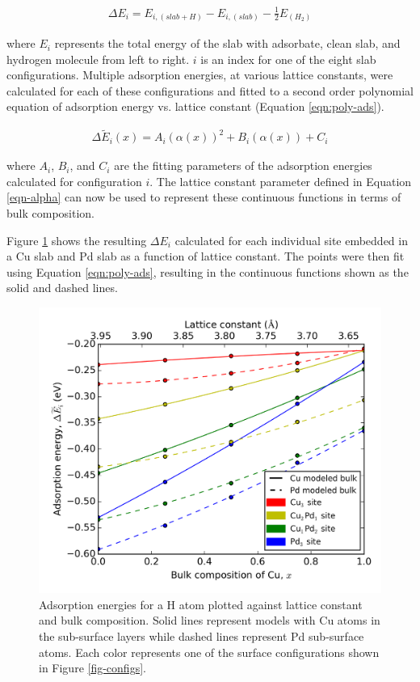 \documentclass[12pt]{cmuthesis}
\begin{document}
\begin{eqnarray}
\Delta E_{i} = E_{i,(slab+H)} - E_{i,(slab)} - \frac{1}{2}E_{(H_{2})} \label{eqn-ads}
\end{eqnarray}

\noindent
where \(E_{i}\) represents the total energy of the slab with adsorbate, clean slab, and hydrogen molecule from left to right. \(i\) is an index for one of the eight slab configurations. Multiple adsorption energies, at various lattice constants, were calculated for each of these configurations and fitted to a second order polynomial equation of adsorption energy vs. lattice constant (Equation \eqref{eqn:poly-ads}).

\begin{eqnarray}
\Delta \widetilde{E}_{i}(x) = A_{i}(\alpha (x))^{2} + B_{i}(\alpha (x)) + C_{i}
\label{eqn:poly-ads}
\end{eqnarray}

\noindent
where \(A_{i}\), \(B_{i}\), and \(C_{i}\) are the fitting parameters of the adsorption energies calculated for configuration \(i\). The lattice constant parameter defined in Equation \eqref{eqn-alpha} can now be used to represent these continuous functions in terms of bulk composition.

Figure \ref{fig:ads-site} shows the resulting \(\Delta E_{i}\) calculated for each individual site embedded in a Cu slab and Pd slab as a function of lattice constant. The points were then fit using Equation \eqref{eqn:poly-ads}, resulting in the continuous functions shown as the solid and dashed lines.

\begin{figure}[h]
\centering
\includegraphics[width=5in]{./images/adsnrg.png}
\caption{Adsorption energies for a H atom plotted against lattice constant and bulk composition. Solid lines represent models with Cu atoms in the sub-surface layers while dashed lines represent Pd sub-surface atoms. Each color represents one of the surface configurations shown in Figure \ref{fig-configs}. \label{fig:ads-site}}
\end{figure}
\end{document}

